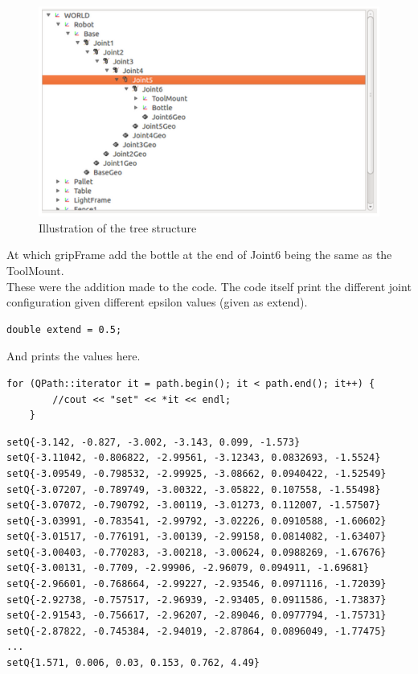 \documentclass[11pt]{article}
\begin{document}
\begin{figure}[H]
\centering
\includegraphics[scale=0.4]{img/Selection_051.png}
\caption{Illustration of the tree structure}
\label{fig::rrt}
\end{figure}

At which gripFrame add the bottle at the end of Joint6 being the same as the ToolMount.\\[0.2cm] 

\noindent These were the addition made to the code. The code itself print the different joint configuration given different epsilon values (given as extend).

\begin{lstlisting}
double extend = 0.5;
\end{lstlisting}

\noindent And prints the values here. 
\begin{lstlisting}
for (QPath::iterator it = path.begin(); it < path.end(); it++) {
        //cout << "set" << *it << endl;
    }
\end{lstlisting}

\begin{lstlisting}
setQ{-3.142, -0.827, -3.002, -3.143, 0.099, -1.573}
setQ{-3.11042, -0.806822, -2.99561, -3.12343, 0.0832693, -1.5524}
setQ{-3.09549, -0.798532, -2.99925, -3.08662, 0.0940422, -1.52549}
setQ{-3.07207, -0.789749, -3.00322, -3.05822, 0.107558, -1.55498}
setQ{-3.07072, -0.790792, -3.00119, -3.01273, 0.112007, -1.57507}
setQ{-3.03991, -0.783541, -2.99792, -3.02226, 0.0910588, -1.60602}
setQ{-3.01517, -0.776191, -3.00139, -2.99158, 0.0814082, -1.63407}
setQ{-3.00403, -0.770283, -3.00218, -3.00624, 0.0988269, -1.67676}
setQ{-3.00131, -0.7709, -2.99906, -2.96079, 0.094911, -1.69681}
setQ{-2.96601, -0.768664, -2.99227, -2.93546, 0.0971116, -1.72039}
setQ{-2.92738, -0.757517, -2.96939, -2.93405, 0.0911586, -1.73837}
setQ{-2.91543, -0.756617, -2.96207, -2.89046, 0.0977794, -1.75731}
setQ{-2.87822, -0.745384, -2.94019, -2.87864, 0.0896049, -1.77475}
...
setQ{1.571, 0.006, 0.03, 0.153, 0.762, 4.49}
\end{lstlisting}
\end{document}
